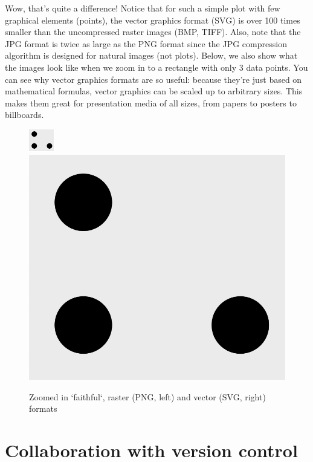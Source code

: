 \documentclass[
]{krantz}
\begin{document}
Wow, that's quite a difference! Notice that for such a simple plot with few graphical elements (points), the vector graphics format (SVG) is over 100
times smaller than the uncompressed raster images (BMP, TIFF). Also, note that the JPG format is twice as large as the PNG format since the JPG
compression algorithm is designed for natural images (not plots). Below, we also show what the images look like when we zoom in to a rectangle with only 3 data points.
You can see why vector graphics formats are so useful: because they're just based on mathematical formulas, vector graphics can be scaled up to arbitrary sizes.
This makes them great for presentation media of all sizes, from papers to posters to billboards.

\begin{figure}

{\centering \includegraphics[width=0.5\linewidth,height=0.5\textheight]{img/faithful_zoom} \includegraphics[width=0.5\linewidth,height=0.5\textheight]{img/faithful_zoom_screenshot_svg} 

}

\caption{Zoomed in `faithful`, raster (PNG, left) and vector (SVG, right) formats}\label{fig:03-raster-image}
\end{figure}

\hypertarget{version_control}{%
\chapter{Collaboration with version control}\label{version_control}}
\end{document}
